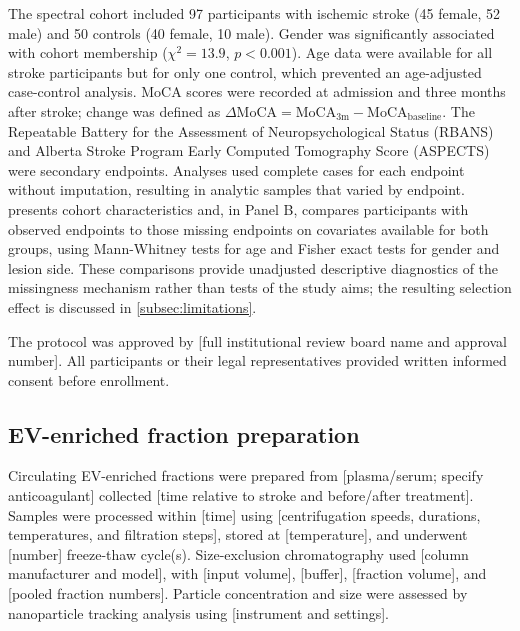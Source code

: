 \documentclass[preprint,12pt]{elsarticle}
\begin{document}
The spectral cohort included 97 participants with ischemic stroke (45 female, 52 male) and 50 controls (40 female, 10 male). Gender was significantly associated with cohort membership ($\chi^2=13.9$, $p<0.001$). Age data were available for all stroke participants but for only one control, which prevented an age-adjusted case-control analysis. MoCA scores were recorded at admission and three months after stroke; change was defined as $\Delta\mathrm{MoCA}=\mathrm{MoCA}_{3\mathrm{m}}- \mathrm{MoCA}_{\mathrm{baseline}}$. The Repeatable Battery for the Assessment of Neuropsychological Status (RBANS) and Alberta Stroke Program Early Computed Tomography Score (ASPECTS) were secondary endpoints. Analyses used complete cases for each endpoint without imputation, resulting in analytic samples that varied by endpoint.  presents cohort characteristics and, in Panel B, compares participants with observed endpoints to those missing endpoints on covariates available for both groups, using Mann-Whitney tests for age and Fisher exact tests for gender and lesion side. These comparisons provide unadjusted descriptive diagnostics of the missingness mechanism rather than tests of the study aims; the resulting selection effect is discussed in \cref{subsec:limitations}.



The protocol was approved by {\color{red}[full institutional review board name and approval number]}. All participants or their legal representatives provided written informed consent before enrollment.

\subsection{EV-enriched fraction preparation} 
\label{subsec:ev_isolation}

Circulating EV-enriched fractions were prepared from {\color{red}[plasma/serum; specify anticoagulant]} collected {\color{red}[time relative to stroke and before/after treatment]}. Samples were processed within {\color{red}[time]} using {\color{red}[centrifugation speeds, durations, temperatures, and filtration steps]}, stored at {\color{red}[temperature]}, and underwent {\color{red}[number]} freeze-thaw cycle(s). Size-exclusion chromatography used {\color{red}[column manufacturer and model]}, with {\color{red}[input volume]}, {\color{red}[buffer]}, {\color{red}[fraction volume]}, and {\color{red}[pooled fraction numbers]}. Particle concentration and size were assessed by nanoparticle tracking analysis using {\color{red}[instrument and settings]}.
\end{document}
